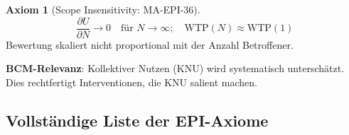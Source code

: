 \documentclass[11pt,a4paper]{article}
\theoremstyle{definition}
\newtheorem{axiom}{Axiom}[section]
\theoremstyle{plain}
\begin{document}
\begin{axiom}[Scope Insensitivity: MA-EPI-36]
\begin{equation}
\frac{\partial U}{\partial N} \rightarrow 0 \quad \text{für } N \rightarrow \infty; \quad \text{WTP}(N) \approx \text{WTP}(1)
\end{equation}
Bewertung skaliert nicht proportional mit der Anzahl Betroffener.

\textbf{BCM-Relevanz}: Kollektiver Nutzen (KNU) wird systematisch unterschätzt. Dies rechtfertigt Interventionen, die KNU salient machen.
\end{axiom}

\subsection{Vollständige Liste der EPI-Axiome}
\end{document}
